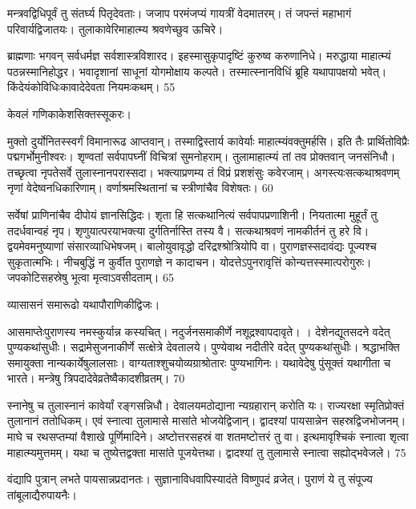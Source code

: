   मन्त्रवद्विधिपूर्वं तु संतर्घ्य पितृदेवताः।
 जजाप परमंजप्यं गायत्रीं वेदमातरम्।
 तं जपन्तं महाभागं परिवार्यद्विजातयः।
 तुलाकावेरिमाहात्म्य श्रवणेच्छुव ऊचिरे।
 
ब्राह्मणाः
भगवन् सर्वधर्मज्ञ सर्वशास्त्रविशारद।
 इहस्मासुकृपादृष्टिं कुरुष्व करुणानिधे।
 मरुद्धाया माहात्म्यं पठन्नस्मानिहोद्धर।
 भवादृशानां साधूनां योगमोक्षाय कल्पते।
 तस्मात्स्नानविधिं ब्रूहि यथापापक्षयो भवेत्।
 किंदेयंकोविधिःकावादेदेवता नियमःकथम्।
 55

  केवलं गणिकाकेशसिक्तस्सूकरः।
 
मुक्तो दुर्योनितस्स्वर्गं विमानारूढ आप्तवान्।
 तस्माद्विस्तार्य कावेर्याः माहात्म्यंवक्तुमर्हसि।
 इति तैः प्रार्थितोविप्रैः पद्मगर्भोमुनीश्वरः।
 शृण्वतां सर्वपापघ्नीं विचित्रां सुमनोहराम्।
 तुलामाहात्म्यं तां तव प्रोक्तवान् जनसंनिधौ।
 तच्छृत्वा नृपतेसर्वे तुलास्नानपरास्सदा।
 भक्त्याप्रणम्य तं विप्रं प्रशशंसुः कवेरजाम्।
 अगस्त्यःसत्कथाश्रवणम् नृणां वेदेष्वनधिकारिणाम्।
 वर्णाश्रमस्थितानां च स्त्रीणांचैव विशेषतः।
 60

  सर्वेषां प्राणिनांचैव दीपोयं ज्ञानसिद्धिदः।
 शृता हि सत्कथानित्यं सर्वपापप्रणाशिनी।
 नियतात्मा मुहूर्तं तु तदर्धवान्वहं नृप।
 शृणुयात्परयाभक्त्या दुर्गतिर्नास्ति तस्य वै।
 सत्कथाश्रवणं नामकीर्तनं तु हरे वि।
 द्वयमेवमनुष्याणां संसारव्याधिभेषजम्।
 बालोयुवावृद्धो दरिद्रश्श्रोत्रियोपि वा।
 पुराणज्ञस्सदावंद्यः पूज्यश्च सुकृतात्मभिः।
 नीचबुद्धिं न कुर्वीत पुराणज्ञे न कादाचन।
 योदत्तेऽपुनरावृत्तिं कोन्यत्तस्स्मात्परोगुरुः।
 जपकोटिसहस्रेषु भूत्वा मृत्वाऽवसीदताम्।
 65

  व्यासासनं समारूढो यथापौराणिकीद्विजः।

आसमाप्तेःपुराणस्य नमस्कुर्यान्न कस्यचित्।
 नदुर्जनसमाकीर्णे नशूद्रश्वापदावृते।
 ।
 देशेनद्यूतसदने वदेत् पुण्यकथांसुधीः।
 सद्रामेसुजनाकीर्णे सत्क्षेत्रे देवतालये।
 पुण्येवाथ नदीतीरे वदेत् पुण्यकथांसुधीः।
 श्रद्धाभक्ति समायुक्ता नान्यकार्येषुलालसाः।
 वाग्यताश्शुचयोव्यग्राश्रोतारः पुण्यभागिनः।
 यथावेदेषु पुंसूक्तं यथागीता च भारते।
 मन्त्रेषु त्रिपदादेवेव्रतेष्वैकादशीव्रतम्।
 70

  स्नानेषु च तुलास्नानं कावेर्यां रङ्गसन्निधौ।
 देवालयमठोद्याना न्यग्रहारान् करोति यः।
 राज्यरक्षा स्मृतिप्रोक्तं तुलानानं ततोधिकम्।
 एवं स्नात्वा तुलामासे मासांते भोजयेद्विजान्।
 द्वादश्यां पायसान्नेन सहस्रद्विजभोजनम्।
 माघे च रथसप्तम्यां वैशाखे पूर्णिमादिने।
 अष्टोत्तरसहस्रं वा शतमष्टोत्तरं तु वा।
 इत्थमावृश्चिकं स्नात्वा शृत्वा माहात्म्यमुत्तमम्।
 यथा च तुष्येत्तद्वक्ता मासांते पूजयेत्तथा।
 द्वादश्यां तु तुलामासे स्नात्वा सह्योद्भवेजले।
 75

  वंद्यापि पुत्रान् लभते पायसान्नप्रदानतः।
 सुज्ञानाविधवापिस्यादंते विष्णुपदं व्रजेत्।
 पुराणं ये तु संपूज्य तांबूलाद्यैरुपायनैः।
 
